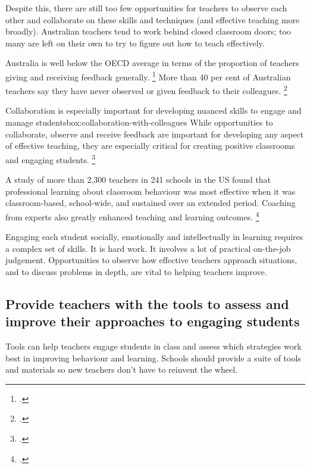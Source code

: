 \documentclass{grattan}
\begin{document}
Despite this, there are still too few opportunities for teachers to observe each other and collaborate on these skills and techniques (and effective teaching more broadly). Australian teachers tend to work behind closed classroom doors; too many are left on their own to try to figure out how to teach effectively.

Australia is well below the OECD average in terms of the proportion of teachers giving and receiving feedback generally.%
    \footcite[][359, 394]{OECD2014TALIS2013ResultsTeachingLearning}
More than 40 per cent of Australian teachers say they have never observed or given feedback to their colleagues.%
    \footcite[][128]{Freeman2014AustralianTeachersLearning}

\begin{smallbox}{Collaboration is especially important for developing nuanced skills to engage and manage students}{box:collaboration-with-colleagues}
While opportunities to collaborate, observe and receive feedback are important for developing any aspect of effective teaching, they are especially critical for creating positive classrooms and engaging students.%
    \footcites{Epstein2008ReducingBehaviorProblems}{Hough2011CharacteristicsEffectiveProfessional}

A study of more than 2,300 teachers in 241 schools in the US found that professional learning about classroom behaviour was most effective when it was classroom-based, school-wide, and sustained over an extended period. Coaching from experts also greatly enhanced teaching and learning outcomes.%
    \footcites{Hough2011CharacteristicsEffectiveProfessional}

Engaging each student socially, emotionally and intellectually in learning requires a complex set of skills. It is hard work. It involves a lot of practical on-the-job judgement. Opportunities to observe how effective teachers approach situations, and to discuss problems in depth, are vital to helping teachers improve.
\end{smallbox}
%

\subsection{Provide teachers with the tools to assess and improve their approaches to engaging students}\label{subsubsec:provide-teachers-with-tools}
Tools can help teachers engage students in class and assess which strategies work best in improving behaviour and learning. Schools should provide a suite of tools and materials so new teachers don't have to reinvent the wheel.
\end{document}
